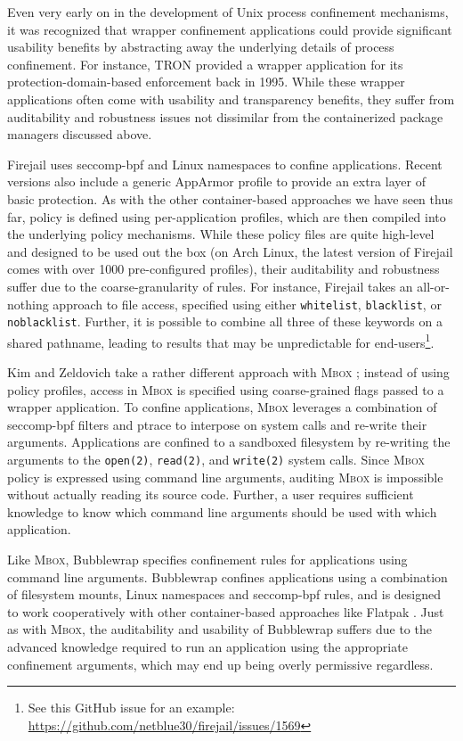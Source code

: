 \documentclass[dvipsnames, 12pt]{article}
\newcommand{\kimmbox}{\textsc{Mbox}}
\begin{document}
Even very early on in the development of Unix process confinement mechanisms, it
was recognized that wrapper confinement applications could provide significant
usability benefits by abstracting away the underlying details of process
confinement.  For instance, TRON \cite{berman1995_tron} provided a wrapper
application for its protection-domain-based enforcement back in 1995. While
these wrapper applications often come with usability and transparency benefits,
they suffer from auditability and robustness issues not dissimilar from the
containerized package managers discussed above.

Firejail \cite{firejail} uses seccomp-bpf and Linux namespaces to confine
applications. Recent versions also include a generic AppArmor profile to provide
an extra layer of basic protection. As with the other container-based approaches
we have seen thus far, policy is defined using per-application profiles, which
are then compiled into the underlying policy mechanisms. While these policy
files are quite high-level and designed to be used out the box (on Arch Linux,
the latest version of Firejail comes with over 1000 pre-configured profiles),
their auditability and robustness suffer due to the coarse-granularity of rules.
For instance, Firejail takes an all-or-nothing approach to file access,
specified using either \texttt{whitelist}, \texttt{blacklist}, or
\texttt{noblacklist}. Further, it is possible to combine all three of these
keywords on a shared pathname, leading to results that may be unpredictable for
end-users\footnote{See this GitHub issue for an example:
\url{https://github.com/netblue30/firejail/issues/1569}}.

Kim and Zeldovich take a rather different approach with \kimmbox{}
\cite{kim2013_mbox}; instead of using policy profiles, access in \kimmbox{} is
specified using coarse-grained flags passed to a wrapper application. To confine
applications, \kimmbox{} leverages a combination of seccomp-bpf filters and
ptrace to interpose on system calls and re-write their arguments.  Applications
are confined to a sandboxed filesystem by re-writing the arguments to the
\texttt{open(2)}, \texttt{read(2)}, and \texttt{write(2)} system calls.  Since
\kimmbox{} policy is expressed using command line arguments, auditing \kimmbox{}
is impossible without actually reading its source code. Further, a user requires
sufficient knowledge to know which command line arguments should be used with
which application.

Like \kimmbox{}, Bubblewrap \cite{bubblewrap} specifies confinement rules for
applications using command line arguments. Bubblewrap confines applications
using a combination of filesystem mounts, Linux namespaces and seccomp-bpf
rules, and is designed to work cooperatively with other container-based
approaches like Flatpak \cite{flatpak}. Just as with \kimmbox{}, the
auditability and usability of Bubblewrap suffers due to the advanced knowledge
required to run an application using the appropriate confinement arguments,
which may end up being overly permissive regardless.
\end{document}
